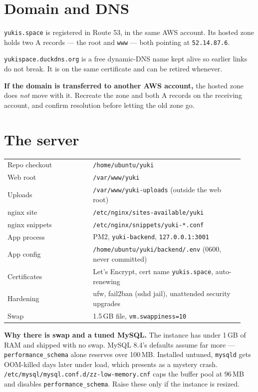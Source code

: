 \documentclass[11pt,a4paper]{article}
\newenvironment{callout}
  {\par\medskip\noindent\begin{list}{}{%
     \setlength{\leftmargin}{1.2em}\setlength{\rightmargin}{0pt}%
     \setlength{\labelwidth}{0pt}\setlength{\itemindent}{0pt}}%
   \item[]\color{ink}\hspace{-1.2em}%
   \makebox[0pt][l]{\raisebox{-0.35\baselineskip}[0pt][0pt]{%
     \textcolor{gold}{\rule{2pt}{1.15\baselineskip}}}}\hspace{1.2em}\ignorespaces}
  {\end{list}\medskip}
\newcommand{\lead}[1]{\textbf{\color{ink}#1}}
\newcommand{\code}[1]{\texttt{\small #1}}
\begin{document}
\section{Domain and DNS}

\code{yukis.space} is registered in Route 53, in the same AWS account. Its
hosted zone holds two A records --- the root and \code{www} --- both pointing
at \code{52.14.87.6}.

\code{yukispace.duckdns.org} is a free dynamic-DNS name kept alive so earlier
links do not break. It is on the same certificate and can be retired whenever.

\begin{callout}
\lead{If the domain is transferred to another AWS account,} the hosted zone
does \emph{not} move with it. Recreate the zone and both A records on the
receiving account, and confirm resolution before letting the old zone go.
\end{callout}

\section{The server}

\begin{longtable}{@{}p{0.34\linewidth}p{0.60\linewidth}@{}}
\toprule
Repo checkout        & \code{/home/ubuntu/yuki} \\
Web root             & \code{/var/www/yuki} \\
Uploads              & \code{/var/www/yuki-uploads} (outside the web root) \\
nginx site           & \code{/etc/nginx/sites-available/yuki} \\
nginx snippets       & \code{/etc/nginx/snippets/yuki-*.conf} \\
App process          & PM2, \code{yuki-backend}, \code{127.0.0.1:3001} \\
App config           & \code{/home/ubuntu/yuki/backend/.env} (0600, never committed) \\
Certificates         & Let's Encrypt, cert name \code{yukis.space}, auto-renewing \\
Hardening            & ufw, fail2ban (sshd jail), unattended security upgrades \\
Swap                 & 1.5\,GB file, \code{vm.swappiness=10} \\
\bottomrule
\end{longtable}

\begin{callout}
\lead{Why there is swap and a tuned MySQL.} The instance has under 1\,GB of
RAM and shipped with no swap. MySQL 8.4's defaults assume far more ---
\code{performance\_schema} alone reserves over 100\,MB. Installed untuned,
\code{mysqld} gets OOM-killed days later under load, which presents as a
mystery crash. \code{/etc/mysql/mysql.conf.d/zz-low-memory.cnf} caps the buffer
pool at 96\,MB and disables \code{performance\_schema}. Raise these only if the
instance is resized.
\end{callout}
\end{document}
